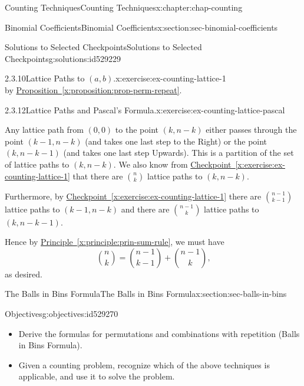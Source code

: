 \documentclass[oneside,10pt,]{book}
\newcommand{\xreffont}{\relax}
\numberwithin{equation}{section}
\begin{document}
\begin{chapterptx}{Counting Techniques}{}{Counting Techniques}{}{}{x:chapter:chap-counting}
\begin{sectionptx}{Binomial Coefficients}{}{Binomial Coefficients}{}{}{x:section:sec-binomial-coefficients}
\begin{solutions-subsection-numberless}{Solutions to Selected Checkpoints}{}{Solutions to Selected Checkpoints}{}{}{g:solutions:id529229}
\begin{inlinesolution}{2.3.10}{Lattice Paths to \((a,b)\).}{x:exercise:ex-counting-lattice-1}
\begin{equation*}
\end{equation*}
by \hyperref[x:proposition:prop-perm-repeat]{Proposition~{\xreffont\ref{x:proposition:prop-perm-repeat}}}.%
\end{inlinesolution}%
\begin{inlinesolution}{2.3.12}{Lattice Paths and Pascal's Formula.}{x:exercise:ex-counting-lattice-pascal}%
\par\smallskip%
\noindent\hypertarget{g:solution:id529195-main}{}Any lattice path from \((0,0)\) to the point \((k,n-k)\) either passes through the point \((k-1,n-k)\) (and takes one last step to the Right) or the point \((k,n-k-1)\) (and takes one last step Upwards). This is a partition of the set of lattice paths to \((k,n-k)\). We also know from \hyperref[x:exercise:ex-counting-lattice-1]{Checkpoint~{\xreffont\ref{x:exercise:ex-counting-lattice-1}}} that there are \(\displaystyle\binom{n}{k}\) lattice paths to \((k,n-k)\).%
\par
Furthermore, by \hyperref[x:exercise:ex-counting-lattice-1]{Checkpoint~{\xreffont\ref{x:exercise:ex-counting-lattice-1}}} there are \(\displaystyle\binom{n-1}{k-1}\) lattice paths to \((k-1,n-k)\) and there are \(\displaystyle\binom{n-1}{k}\) lattice paths to \((k,n-k-1)\).%
\par
Hence by \hyperref[x:principle:prin-sum-rule]{Principle~{\xreffont\ref{x:principle:prin-sum-rule}}}, we must have%
\begin{equation*}
\binom{n}{k} = \binom{n-1}{k-1} + \binom{n-1}{k}\text{,}
\end{equation*}
as desired.%
\end{inlinesolution}%
\end{solutions-subsection-numberless}
\end{sectionptx}
%
%
\typeout{************************************************}
\typeout{************************************************}
%
\begin{sectionptx}{The Balls in Bins Formula}{}{The Balls in Bins Formula}{}{}{x:section:sec-balls-in-bins}
\begin{objectives}{Objectives}{g:objectives:id529270}
%
\begin{itemize}[label=\textbullet]
\item{}Derive the formulas for permutations and combinations with repetition (Balls in Bins Formula).%
\item{}Given a counting problem, recognize which of the above techniques is applicable, and use it to solve the problem.%

\end{itemize}
\end{objectives}
\end{sectionptx}
\end{chapterptx}
\end{document}
